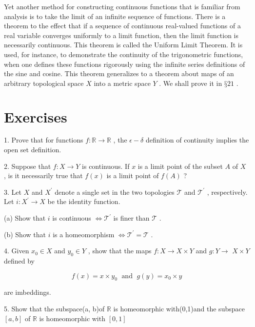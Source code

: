 Yet another method for constructing continuous functions that is familiar from analysis is to take the limit of an infinite sequence of functions. There is a theorem to the effect that if a sequence of continuous real-valued functions of a real variable converges uniformly to a limit function, then the limit function is necessarily continuous. This theorem is called the Uniform Limit Theorem. It is used, for instance, to demonstrate the continuity of the trigonometric functions, when one defines these functions rigorously using the infinite series definitions of the sine and cosine. This theorem generalizes to a theorem about maps of an arbitrary topological space \(X\) into a metric space \(Y\) . We shall prove it in \(§{21}\) .

\section*{Exercises}

1. Prove that for functions \(f : \mathbb{R} \rightarrow  \mathbb{R}\) , the \(\epsilon  - \delta\) definition of continuity implies the open set definition.

2. Suppose that \(f : X \rightarrow  Y\) is continuous. If \(x\) is a limit point of the subset \(A\) of \(X\) , is it necessarily true that \(f\left( x\right)\) is a limit point of \(f\left( A\right)\) ?

3. Let \(X\) and \({X}^{\prime }\) denote a single set in the two topologies \(\mathcal{T}\) and \({\mathcal{T}}^{\prime }\) , respectively. Let \(i : {X}^{\prime } \rightarrow  X\) be the identity function.

(a) Show that \(i\) is continuous \(\Leftrightarrow  {\mathcal{T}}^{\prime }\) is finer than \(\mathcal{T}\) .

(b) Show that \(i\) is a homeomorphism \(\Leftrightarrow  {\mathcal{T}}^{\prime } = \mathcal{T}\) .

4. Given \({x}_{0} \in  X\) and \({y}_{0} \in  Y\) , show that the maps \(f : X \rightarrow  X \times  Y\) and \(g : Y \rightarrow\)  \(X \times  Y\) defined by

\[
f\left( x\right)  = x \times  {y}_{0}\;\text{ and }\;g\left( y\right)  = {x}_{0} \times  y
\]

are imbeddings.

5. Show that the subspace(a, b)of \(\mathbb{R}\) is homeomorphic with(0,1)and the subspace \(\left\lbrack  {a,b}\right\rbrack\) of \(\mathbb{R}\) is homeomorphic with \(\left\lbrack  {0,1}\right\rbrack\)

